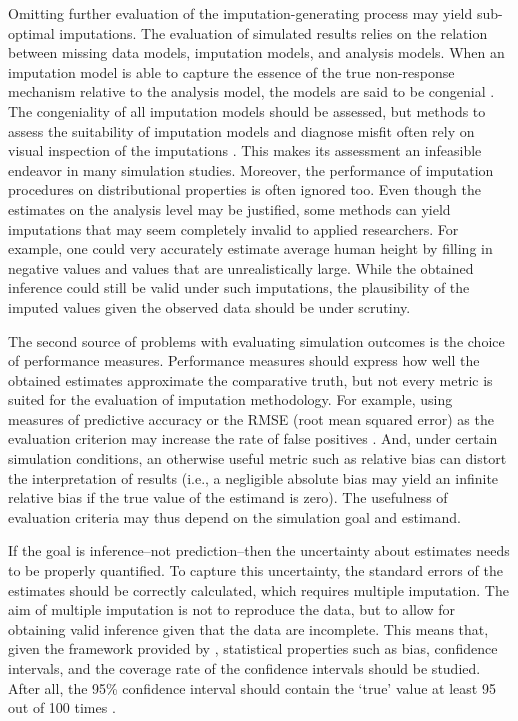 \documentclass[bimj,fleqn]{w-art}
\begin{document}
Omitting further evaluation of the imputation-generating process may yield sub-optimal imputations. The evaluation of simulated results relies on the relation between missing data models, imputation models, and analysis models. When an imputation model is able to capture the essence of the true non-response mechanism relative to the analysis model, the models are said to be congenial \citep{meng94}. The congeniality of all imputation models should be assessed, but methods to assess the suitability of imputation models and diagnose misfit often rely on visual inspection of the imputations \citep[see e.g.][]{abayomi2008diagnostics, bond16}. This makes its assessment an infeasible endeavor in many simulation studies. Moreover, the performance of imputation procedures on distributional properties is often ignored too. Even though the estimates on the analysis level may be justified, some methods can yield imputations that may seem completely invalid to applied researchers. For example, one could very accurately estimate average human height by filling in negative values and values that are unrealistically large. While the obtained inference could still be valid under such imputations, the plausibility of the imputed values given the observed data should be under scrutiny.

The second source of problems with evaluating simulation outcomes is the choice of performance measures. Performance measures should express how well the obtained estimates approximate the comparative truth, but not every metric is suited for the evaluation of imputation methodology. For example, using measures of predictive accuracy or the RMSE (root mean squared error) as the evaluation criterion may increase the rate of false positives \citep[][\S 2.6]{buur18}. And, under certain simulation conditions, an otherwise useful metric such as relative bias can distort the interpretation of results (i.e., a negligible absolute bias may yield an infinite relative bias if the true value of the estimand is zero). The usefulness of evaluation criteria may thus depend on the simulation goal and estimand.

If the goal is inference--not prediction--then the uncertainty about estimates needs to be properly quantified. To capture this uncertainty, the standard errors of the estimates should be correctly calculated, which requires multiple imputation. The aim of multiple imputation is not to reproduce the data, but to allow for obtaining valid inference given that the data are incomplete. This means that, given the framework provided by \citet{rubi87}, statistical properties such as bias, confidence intervals, and the coverage rate of the confidence intervals should be studied. After all, the 95\% confidence interval should contain the `true' value at least 95 out of 100 times \citep[][p. 591]{neym34}. 
\end{document}

